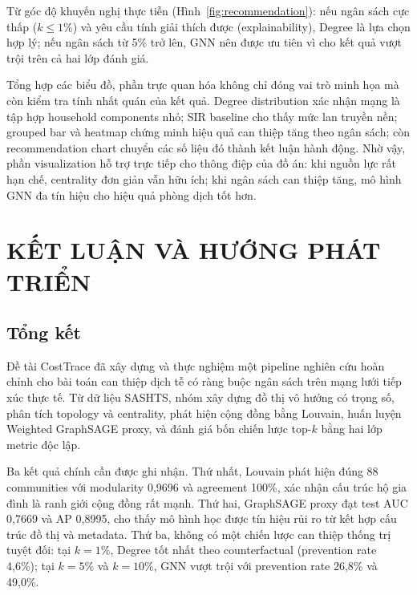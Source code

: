 \documentclass[12pt,a4paper]{report}
\theoremstyle{definition}
\begin{document}
Từ góc độ khuyến nghị thực tiễn (Hình~\ref{fig:recommendation}): nếu ngân sách cực thấp ($k \leq 1\%$) và yêu cầu tính giải thích được (explainability), Degree là lựa chọn hợp lý; nếu ngân sách từ 5\% trở lên, GNN nên được ưu tiên vì cho kết quả vượt trội trên cả hai lớp đánh giá.

Tổng hợp các biểu đồ, phần trực quan hóa không chỉ đóng vai trò minh họa mà còn kiểm tra tính nhất quán của kết quả. Degree distribution xác nhận mạng là tập hợp household components nhỏ; SIR baseline cho thấy mức lan truyền nền; grouped bar và heatmap chứng minh hiệu quả can thiệp tăng theo ngân sách; còn recommendation chart chuyển các số liệu đó thành kết luận hành động. Nhờ vậy, phần visualization hỗ trợ trực tiếp cho thông điệp của đồ án: khi nguồn lực rất hạn chế, centrality đơn giản vẫn hữu ích; khi ngân sách can thiệp tăng, mô hình GNN đa tín hiệu cho hiệu quả phòng dịch tốt hơn.

\chapter{KẾT LUẬN VÀ HƯỚNG PHÁT TRIỂN}

\section{Tổng kết}

Đề tài CostTrace đã xây dựng và thực nghiệm một pipeline nghiên cứu hoàn chỉnh cho bài toán can thiệp dịch tễ có ràng buộc ngân sách trên mạng lưới tiếp xúc thực tế. Từ dữ liệu SASHTS, nhóm xây dựng đồ thị vô hướng có trọng số, phân tích topology và centrality, phát hiện cộng đồng bằng Louvain, huấn luyện Weighted GraphSAGE proxy, và đánh giá bốn chiến lược top-$k$ bằng hai lớp metric độc lập.

Ba kết quả chính cần được ghi nhận. Thứ nhất, Louvain phát hiện đúng 88 communities với modularity 0,9696 và agreement 100\%, xác nhận cấu trúc hộ gia đình là ranh giới cộng đồng rất mạnh. Thứ hai, GraphSAGE proxy đạt test AUC 0,7669 và AP 0,8995, cho thấy mô hình học được tín hiệu rủi ro từ kết hợp cấu trúc đồ thị và metadata. Thứ ba, không có một chiến lược can thiệp thống trị tuyệt đối: tại $k=1\%$, Degree tốt nhất theo counterfactual (prevention rate 4,6\%); tại $k=5\%$ và $k=10\%$, GNN vượt trội với prevention rate 26,8\% và 49,0\%.
\end{document}
